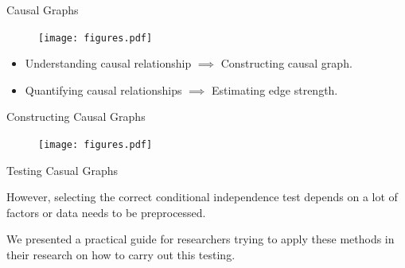 \documentclass[aspectratio=169]{beamer}
\begin{document}
\begin{frame}{Causal Graphs}
	\vspace{1em}

	\begin{figure}
		\texttt{[image: figures.pdf]}
	\end{figure}

	\vspace{1em}
	\begin{itemize}
		\item Understanding causal relationship $ \implies $ Constructing causal graph.
		\item Quantifying causal relationships $ \implies $ Estimating edge strength.
	\end{itemize}
\end{frame}

% 
% 
% 

\begin{frame}{Constructing Causal Graphs}




\begin{figure}
	\texttt{[image: figures.pdf]}
\end{figure}
	
\end{frame}

\begin{frame}{Testing Casual Graphs}

	However, selecting the correct conditional independence test depends on a lot of factors or data needs to be preprocessed.

	We presented a practical guide for researchers trying to apply these methods in their research on how to carry out this testing.
\end{frame}
\end{document}
